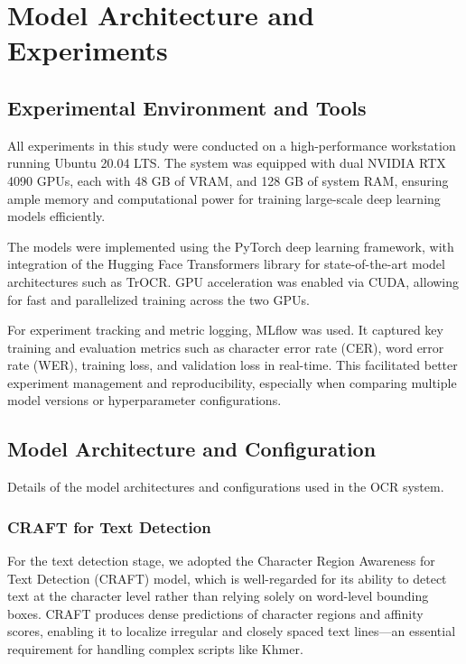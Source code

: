\chapter{Model Architecture and Experiments}
\label{ch:experiments}

\section{Experimental Environment and Tools}
\label{sec:environment}
All experiments in this study were conducted on a high-performance workstation running 
Ubuntu 20.04 LTS. The system was equipped with dual NVIDIA RTX 4090 GPUs, each with 
48 GB of VRAM, and 128 GB of system RAM, ensuring ample memory and computational power 
for training large-scale deep learning models efficiently.

The models were implemented using the PyTorch deep learning framework, with integration of the Hugging Face Transformers library for state-of-the-art model architectures such as TrOCR. GPU acceleration was enabled via CUDA, allowing for fast and parallelized training across the two GPUs.

For experiment tracking and metric logging, MLflow was used. It captured key training 
and evaluation metrics such as character error rate (CER), word error rate (WER), 
training loss, and validation loss in real-time. This facilitated better experiment 
management and reproducibility, especially when comparing multiple model versions or 
hyperparameter configurations.



\section{Model Architecture and Configuration}
\label{sec:architecture}
Details of the model architectures and configurations used in the OCR system.

\subsection{CRAFT for Text Detection}
\label{subsec:craft}

For the text detection stage, we adopted the Character Region Awareness for Text 
Detection (CRAFT) model, which is well-regarded for its ability to detect text at 
the character level rather than relying solely on word-level bounding boxes. 
CRAFT produces dense predictions of character regions and affinity scores, 
enabling it to localize irregular and closely spaced text lines—an essential 
requirement for handling complex scripts like Khmer.

